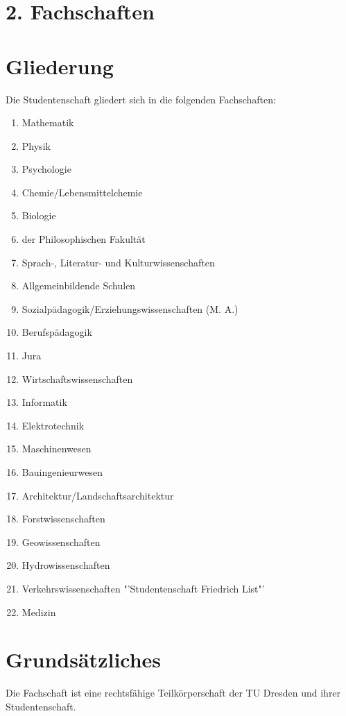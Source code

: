 \begin{multicols}{2}
\section*{2. Fachschaften}



\section{Gliederung}

\Abs \Satz Die Studentenschaft gliedert sich in die folgenden Fachschaften:
\begin{enumerate}
\item Mathematik
\item Physik
\item Psychologie
\item Chemie/Lebensmittelchemie
\item Biologie
\item der Philosophischen Fakultät
\item Sprach-, Literatur- und Kulturwissenschaften
\item Allgemeinbildende Schulen
\item Sozialpädagogik/Erziehungswissenschaften (M. A.)
\item Berufspädagogik
\item Jura
\item Wirtschaftswissenschaften
\item Informatik
\item Elektrotechnik
\item Maschinenwesen
\item Bauingenieurwesen
\item Architektur/Landschaftsarchitektur
\item Forstwissenschaften
\item Geowissenschaften
\item Hydrowissenschaften
\item Verkehrswissenschaften "'Studentenschaft Friedrich List"'
\item Medizin
\end{enumerate}



\section{Grundsätzliches}

\Abs \Satz Die Fachschaft ist eine rechtsfähige Teilkörperschaft der TU Dresden und ihrer Studentenschaft.


\end{multicols}
